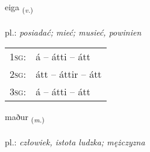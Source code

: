 \documentclass[frontgrid, backgrid]{flacards}\usepackage[]{graphicx}\usepackage[]{xcolor}
\begin{document}
{eiga \small{\textsubscript{(\textit{v.})}} \\[1ex] %
\textphonetic{[eiːɣa]} \\
pl.: \emph{posiadać; mieć; musieć, powinien} \\  [2ex]
\renewcommand*{\arraystretch}{0.8}
\begin{tabular}{p{1cm}l}
\textsc{1sg}: & á -- átti -- átt \\ 
\textsc{2sg}: & átt -- áttir -- átt \\ 
\textsc{3sg}: & á -- átti -- átt \\ 
\end{tabular}
}

\renewcommand{\flhead}{\vskip5pt \fboxsep=0pt {\small\bfseries\footnotesize Nafnorð | rzeczownik}}
\renewcommand{\fcfoot}{\vskip5pt \fboxsep=0pt \hspace{2pt}{\small\bfseries\footnotesize 1K}}

\renewcommand{\blhead}{\vskip5pt {\small\bfseries\footnotesize Nafnorð | rzeczownik }}
\renewcommand{\bcfoot}{\vskip5pt \hspace{2pt}{\small\bfseries\footnotesize 1K}}


{maður \small{\textsubscript{(\textit{m.})}} \\[1ex] %
\textphonetic{[maːðʏr]} \\
pl.: \emph{człowiek, istota ludzka; mężczyzna} \\  [2ex]
\renewcommand*{\arraystretch}{0.8}
}


\renewcommand{\flhead}{\vskip5pt \fboxsep=0pt {\small\bfseries\footnotesize Forsetning | przyimek}}
\renewcommand{\fcfoot}{\vskip5pt \fboxsep=0pt \hspace{2pt}{\small\bfseries\footnotesize 1K}}
\end{document}
